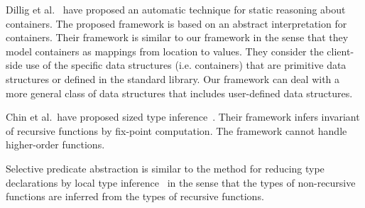 Dillig et al.~\cite{Dillig2011} have proposed an automatic technique for
static reasoning about containers.  The proposed framework is based on
an abstract interpretation for containers.  Their framework is similar
to our framework in the sense that they model containers as mappings
from location to values.  They consider the client-side use of the
specific data structures (i.e. containers) that are primitive data
structures or defined in the standard library.  Our framework can deal with a
more general class of data structures that includes user-defined data
structures.

Chin et al.~have proposed sized type inference~\cite{Chin2003}.  Their
framework infers invariant of recursive functions by fix-point
computation.  The framework cannot handle higher-order functions.

Selective predicate abstraction is similar to the method for reducing type
declarations by local type inference~\cite{Pierce2000} in the sense that the types
of non-recursive functions are inferred from the types of recursive functions.
